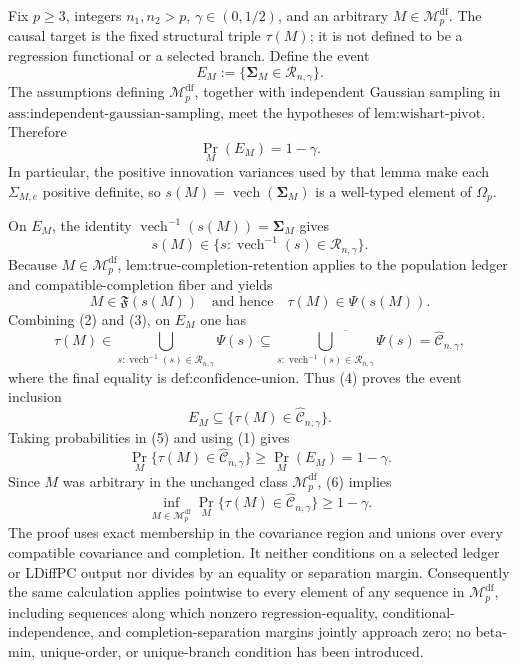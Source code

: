 Fix \(p\geq 3\), integers \(n_1,n_2>p\), \(\gamma\in(0,1/2)\), and an arbitrary \(M\in\mathcal M_p^{\mathrm{df}}\).  The causal target is the fixed structural triple \(\tau(M)\); it is not defined to be a regression functional or a selected branch.  Define the event
\[
E_M:=\{\boldsymbol\Sigma_M\in\mathcal R_{n,\gamma}\}.
\]
The assumptions defining \(\mathcal M_p^{\mathrm{df}}\), together with independent Gaussian sampling in \(\text{ass:independent-gaussian-sampling}\), meet the hypotheses of \(\text{lem:wishart-pivot}\).  Therefore
\[
\Pr_M(E_M)=1-\gamma. \tag{1}
\]
In particular, the positive innovation variances used by that lemma make each \(\Sigma_{M,e}\) positive definite, so \(s(M)=\operatorname{vech}(\boldsymbol\Sigma_M)\) is a well-typed element of \(\Omega_p\).

On \(E_M\), the identity \(\operatorname{vech}^{-1}(s(M))=\boldsymbol\Sigma_M\) gives
\[
s(M)\in\{s:\operatorname{vech}^{-1}(s)\in\mathcal R_{n,\gamma}\}. \tag{2}
\]
Because \(M\in\mathcal M_p^{\mathrm{df}}\), \(\text{lem:true-completion-retention}\) applies to the population ledger and compatible-completion fiber and yields
\[
M\in\mathfrak F(s(M))
\quad\text{and hence}\quad
\tau(M)\in\Psi(s(M)). \tag{3}
\]
Combining (2) and (3), on \(E_M\) one has
\[
\tau(M)
\in
\bigcup_{s:\operatorname{vech}^{-1}(s)\in\mathcal R_{n,\gamma}}\Psi(s)
\subseteq
\overline{\bigcup_{s:\operatorname{vech}^{-1}(s)\in\mathcal R_{n,\gamma}}\Psi(s)}
=\widehat{\mathcal C}_{n,\gamma}, \tag{4}
\]
where the final equality is \(\text{def:confidence-union}\).  Thus (4) proves the event inclusion
\[
E_M\subseteq\{\tau(M)\in\widehat{\mathcal C}_{n,\gamma}\}. \tag{5}
\]
Taking probabilities in (5) and using (1) gives
\[
\Pr_M\{\tau(M)\in\widehat{\mathcal C}_{n,\gamma}\}
\geq \Pr_M(E_M)
=1-\gamma. \tag{6}
\]
Since \(M\) was arbitrary in the unchanged class \(\mathcal M_p^{\mathrm{df}}\), (6) implies
\[
\inf_{M\in\mathcal M_p^{\mathrm{df}}}
\Pr_M\{\tau(M)\in\widehat{\mathcal C}_{n,\gamma}\}
\geq 1-\gamma.
\]
The proof uses exact membership in the covariance region and unions over every compatible covariance and completion.  It neither conditions on a selected ledger or LDiffPC output nor divides by an equality or separation margin.  Consequently the same calculation applies pointwise to every element of any sequence in \(\mathcal M_p^{\mathrm{df}}\), including sequences along which nonzero regression-equality, conditional-independence, and completion-separation margins jointly approach zero; no beta-min, unique-order, or unique-branch condition has been introduced.